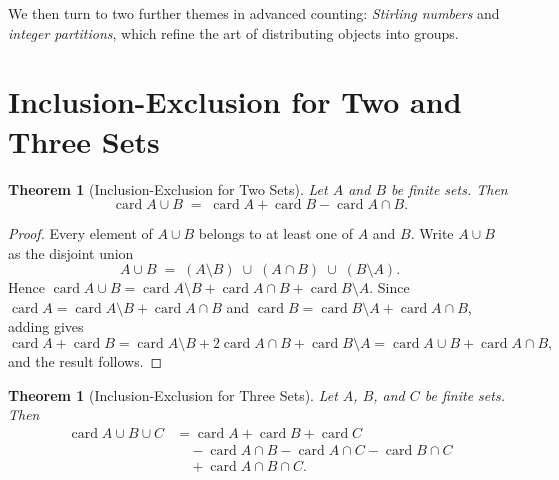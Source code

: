 \documentclass[12pt,a4paper,openany]{book}
\theoremstyle{definition}
\theoremstyle{plain}
\newtheorem{theorem}[definition]{Theorem}
\theoremstyle{remark}
\DeclareMathOperator{\card}{card}
\begin{document}
We then turn to two further themes in advanced counting:
\emph{Stirling numbers} and
\emph{integer partitions}, which refine the
art of distributing objects into groups.



\section{Inclusion-Exclusion for Two and Three Sets}\label{sec:ie-two-three}

\begin{theorem}[Inclusion-Exclusion for Two Sets]\label{thm:ie-two}
Let $A$ and $B$ be finite sets.  Then
\[
  \card{A \cup B} \;=\; \card{A} + \card{B} - \card{A \cap B}.
\]
\end{theorem}

\begin{proof}
Every element of $A \cup B$ belongs to at least one of $A$ and $B$.
Write $A \cup B$ as the disjoint union
\[
  A \cup B \;=\; (A \setminus B)\;\cup\;(A \cap B)\;\cup\;(B \setminus A).
\]
Hence $\card{A \cup B} = \card{A \setminus B} + \card{A \cap B} +
\card{B \setminus A}$.  Since $\card{A} = \card{A \setminus B} +
\card{A \cap B}$ and $\card{B} = \card{B \setminus A} +
\card{A \cap B}$, adding gives
\[
  \card{A} + \card{B}
  = \card{A \setminus B} + 2\card{A \cap B} + \card{B \setminus A}
  = \card{A \cup B} + \card{A \cap B},
\]
and the result follows.
\end{proof}

\begin{center}
\end{center}

\begin{theorem}[Inclusion-Exclusion for Three Sets]\label{thm:ie-three}
Let $A$, $B$, and $C$ be finite sets.  Then
\begin{align*}
  \card{A \cup B \cup C}
  &= \card{A} + \card{B} + \card{C} \\
  &\quad - \card{A \cap B} - \card{A \cap C} - \card{B \cap C} \\
  &\quad + \card{A \cap B \cap C}.
\end{align*}
\end{theorem}
\end{document}
